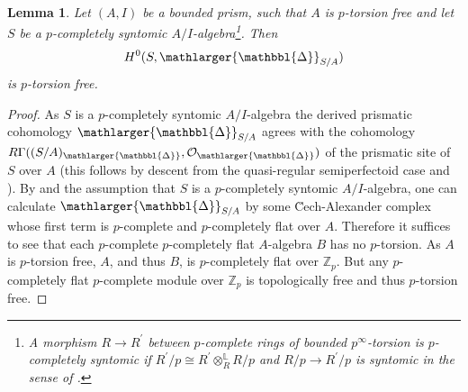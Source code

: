 \documentclass{amsart}
\newcommand{\prism}{{\mathlarger{\mathbbl{\Delta}}}}
\theoremstyle{plain}
\newtheorem{lemma}[theorem]{Lemma}
\theoremstyle{definition}
\newcommand{\Z}{\mathbb{Z}}
\newcommand{\red}[1]{{\color{black} #1}}
\begin{document}
  \begin{lemma}
    \label{sec:prism-dieud-theory-lemma-h-0-p-torsion-free-for-syntomic-things}
    Let $(A,I)$ be a bounded prism, such that $A$ is $p$-torsion free and let $S$ be a $p$-completely syntomic $A/I$-algebra\footnote{A morphism $R\to R^\prime$ between $p$-complete rings of bounded $p^\infty$-torsion is $p$-completely syntomic if $R^\prime/p\cong R^\prime\otimes_R^{\mathbb{L}} R/p$ and $R/p\to R^\prime/p$ is syntomic in the sense of \cite[Tag 00SL]{stacks_project}.}. Then
    $$
    H^0(S,\prism_{S/A})
    $$
    is $p$-torsion free.
  \end{lemma}
  \begin{proof}
    As $S$ is a $p$-completely syntomic $A/I$-algebra the derived prismatic cohomology $\prism_{S/A}$ agrees with the cohomology $R\Gamma((S/A)_\prism,\mathcal{O}_\prism)$ of the prismatic site of $S$ over $A$ (this follows by descent from the quasi-regular semiperfectoid case and ). 
    By \cite[Proposition 3.13]{bhatt_scholze_prisms_and_prismatic_cohomology} and the assumption that $S$ is a $p$-completely syntomic $A/I$-algebra, one can calculate $\prism_{S/A}$ by some \u{Cech}-Alexander complex \red{whose first term is $p$-complete and $p$-completely flat over $A$}. Therefore it suffices to see that each $p$-complete $p$-completely flat $A$-algebra $B$ has no $p$-torsion. As $A$ is $p$-torsion free, $A$, and thus $B$, is $p$-completely flat over $\Z_p$. But any $p$-completely flat $p$-complete module over $\Z_p$ is topologically free and thus $p$-torsion free.
  \end{proof}
\end{document}
